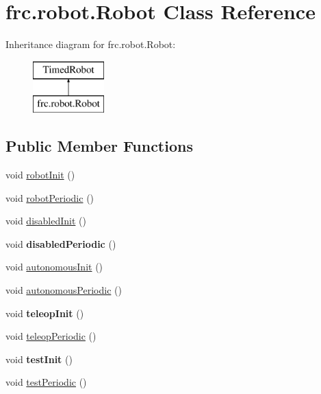 \hypertarget{classfrc_1_1robot_1_1_robot}{}\section{frc.\+robot.\+Robot Class Reference}
\label{classfrc_1_1robot_1_1_robot}
Inheritance diagram for frc.\+robot.\+Robot\+:\begin{figure}[H]
\begin{center}
\leavevmode
\includegraphics[height=2.000000cm]{classfrc_1_1robot_1_1_robot}
\end{center}
\end{figure}
\subsection*{Public Member Functions}
\begin{DoxyCompactItemize}
\item 
void \mbox{\hyperlink{classfrc_1_1robot_1_1_robot_a1d28582cf3dc31568c3581f631c92f13}{robot\+Init}} ()
\item 
void \mbox{\hyperlink{classfrc_1_1robot_1_1_robot_a7e63e32ebe8ad3d33bbc3b09092a9f1f}{robot\+Periodic}} ()
\item 
void \mbox{\hyperlink{classfrc_1_1robot_1_1_robot_ac19810fbf26efd4cd47cbd7568b4ad2a}{disabled\+Init}} ()
\item 
\mbox{\label{classfrc_1_1robot_1_1_robot_a2bc1b0ce100e4783ba3d549e6ac07ae3}} 
void {\bfseries disabled\+Periodic} ()
\item 
void \mbox{\hyperlink{classfrc_1_1robot_1_1_robot_a5b1c022cd3e2b9f6e5dde62571839173}{autonomous\+Init}} ()
\item 
void \mbox{\hyperlink{classfrc_1_1robot_1_1_robot_a7dcfe7d0d65d1051eb095b8eb1aebd72}{autonomous\+Periodic}} ()
\item 
\mbox{\label{classfrc_1_1robot_1_1_robot_a209dbf07bfec75d73fa53126a8e31b88}} 
void {\bfseries teleop\+Init} ()
\item 
void \mbox{\hyperlink{classfrc_1_1robot_1_1_robot_ae807171661cbc29081bc10f06d6831e7}{teleop\+Periodic}} ()
\item 
\mbox{\label{classfrc_1_1robot_1_1_robot_acdebc9c7e7e31ffccb3c2496b8d33944}} 
void {\bfseries test\+Init} ()
\item 
void \mbox{\hyperlink{classfrc_1_1robot_1_1_robot_abd152f34b9f33d5cdf835aa61331f33e}{test\+Periodic}} ()
\end{DoxyCompactItemize}
